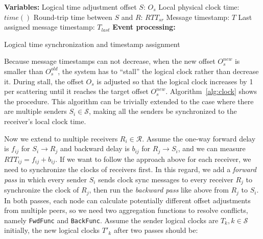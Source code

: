 {%

\begin{algorithm}[t]
\DontPrintSemicolon
\textbf{Variables:}\;
Logical time adjustment offset $S$: $O_{s}$\;
Local physical clock time: $time()$\;
Round-trip time between $S$ and $R$: $RTT_{sr}$\;
Message timestamp: $T$\;
Last assigned message timestamp: $T_{last}$ \;
\;
\textbf{Event processing:}\;
\caption{Logical time synchronization and timestamp assignment}
\label{alg:clock}
\end{algorithm}

Because message timestamps can not decrease, when the new offset $O_s^{new}$ is smaller than $O_s^{old}$, the system has to ``stall'' the logical clock rather than decrease it.
During stall, the offset $O_s$ is adjusted so that the logical clock increases by 1 per scattering until it reaches the target offset $O_s^{new}$. Algorithm~\ref{alg:clock} shows the procedure. This algorithm can be trivially extended to the case where there are multiple senders $S_i \in \mathcal{S}$, making all the senders be synchronized to the receiver's local clock time.

Now we extend to multiple receivers $R_i \in \mathcal{R}$.
Assume the one-way forward delay is $f_{ij}$ for $S_i \rightarrow R_j$ and backward delay is $b_{ij}$ for $R_j \rightarrow S_i$, and we can measure $RTT_{ij} = f_{ij} + b_{ij}$.
If we want to follow the approach above for each receiver, we need to synchronize the clocks of receivers first.
In this regard, we add a \textit{forward pass} in which every sender $S_i$ sends clock sync messages to every receiver $R_j$ to synchronize the clock of $R_j$, then run the \textit{backward pass} like above from $R_j$ to $S_i$.
In both passes, each node can calculate potentially different offset adjustments from multiple peers, so we need two aggregation functions to resolve conflicts, namely \texttt{FwdFunc} and \texttt{BackFunc}.
Assume the sender logical clocks are $T_k, k \in \mathcal{S}$ initially, the new logical clocks $T'_k$ after two passes should be:

}
